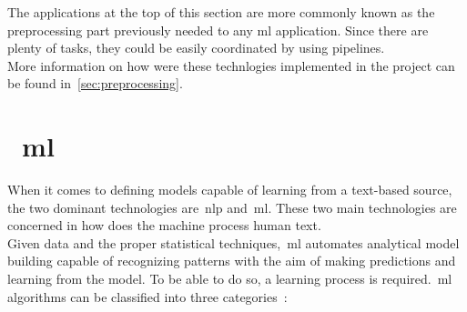 The applications at the top of this section are more commonly known as the preprocessing part previously needed to any \ac{ml} application. Since there are plenty of tasks, they could be easily coordinated by using pipelines.\\ 
More information on how were these technlogies implemented in the project can be found in~\cref{sec:preprocessing}.

\section{~\acl{ml} \cite{tfidf}}
When it comes to defining models capable of learning from a text-based source, the two dominant technologies are~\acl{nlp} and~\acl{ml}. These two main technologies are concerned in how does the machine process human text. \\
Given data and the proper statistical techniques,~\ac{ml} automates analytical model building capable of recognizing patterns with the aim of making predictions and learning from the model. To be able to do so, a learning process is required.~\ac{ml} algorithms can be classified into three categories~\cite{dataclust}:
